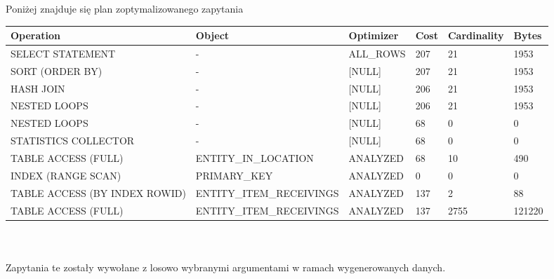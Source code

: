 \documentclass[11pt]{article}
\numberwithin{figure}{subsection}
\begin{document}
		Poniżej znajduje się plan zoptymalizowanego zapytania \\
		
		\begin{tabularx}{\textwidth}{|X|X|X|X|X|X|}
Operation&Object&Optimizer&Cost&Cardinality&Bytes\\ \hline
SELECT STATEMENT& - &ALL\_ROWS&207&21&1953\\ \hline
SORT (ORDER BY)& - &[NULL]&207&21&1953\\ \hline
HASH JOIN& - &[NULL]&206&21&1953\\ \hline
NESTED LOOPS& - &[NULL]&206&21&1953\\ \hline
NESTED LOOPS& - &[NULL]&68&0&0\\ \hline
STATISTICS COLLECTOR& - &[NULL]&68&0&0\\ \hline
TABLE ACCESS (FULL)&ENTITY\_IN\_LOCATION&ANALYZED&68&10&490\\ \hline
INDEX (RANGE SCAN)&PRIMARY\_KEY&ANALYZED&0&0&0\\ \hline
TABLE ACCESS (BY INDEX ROWID)&ENTITY\_ITEM\_RECEIVINGS&ANALYZED&137&2&88\\ \hline
TABLE ACCESS (FULL)&ENTITY\_ITEM\_RECEIVINGS&ANALYZED&137&2755&121220\\ \hline
		\end{tabularx}
		
		
		
		
		
		
		
		
		
		
		
	
	\subsection{}
			
		\begin{lstlisting}[caption={Wersja niezoptymalizowana},captionpos=b]
		\end{lstlisting}
			
		\begin{lstlisting}[caption={Wersja zoptymalizowana},captionpos=b]
		\end{lstlisting}
		
		Zapytania te zostały wywołane z losowo wybranymi argumentami w ramach
		wygenerowanych danych. \\
		
		\begin{lstlisting}[caption={Wywołanie zapytań}, captionpos=b]
		\end{lstlisting}
		
\end{document}
